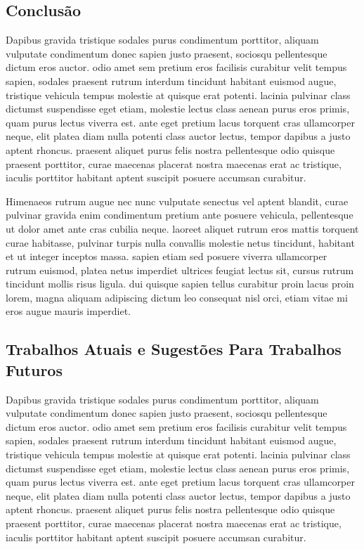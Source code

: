 \subsection{Conclusão}

Dapibus gravida tristique sodales purus condimentum porttitor, aliquam vulputate condimentum donec sapien justo praesent, sociosqu pellentesque dictum eros auctor. odio amet sem pretium eros facilisis curabitur velit tempus sapien, sodales praesent rutrum interdum tincidunt habitant euismod augue, tristique vehicula tempus molestie at quisque erat potenti. lacinia pulvinar class dictumst suspendisse eget etiam, molestie lectus class aenean purus eros primis, quam purus lectus viverra est. ante eget pretium lacus torquent cras ullamcorper neque, elit platea diam nulla potenti class auctor lectus, tempor dapibus a justo aptent rhoncus. praesent aliquet purus felis nostra pellentesque odio quisque praesent porttitor, curae maecenas placerat nostra maecenas erat ac tristique, iaculis porttitor habitant aptent suscipit posuere accumsan curabitur. 

Himenaeos rutrum augue nec nunc vulputate senectus vel aptent blandit, curae pulvinar gravida enim condimentum pretium ante posuere vehicula, pellentesque ut dolor amet ante cras cubilia neque. laoreet aliquet rutrum eros mattis torquent curae habitasse, pulvinar turpis nulla convallis molestie netus tincidunt, habitant et ut integer inceptos massa. sapien etiam sed posuere viverra ullamcorper rutrum euismod, platea netus imperdiet ultrices feugiat lectus sit, cursus rutrum tincidunt mollis risus ligula. dui quisque sapien tellus curabitur proin lacus proin lorem, magna aliquam adipiscing dictum leo consequat nisl orci, etiam vitae mi eros augue mauris imperdiet.


\subsection{Trabalhos Atuais e Sugestões Para Trabalhos Futuros}

Dapibus gravida tristique sodales purus condimentum porttitor, aliquam vulputate condimentum donec sapien justo praesent, sociosqu pellentesque dictum eros auctor. odio amet sem pretium eros facilisis curabitur velit tempus sapien, sodales praesent rutrum interdum tincidunt habitant euismod augue, tristique vehicula tempus molestie at quisque erat potenti. lacinia pulvinar class dictumst suspendisse eget etiam, molestie lectus class aenean purus eros primis, quam purus lectus viverra est. ante eget pretium lacus torquent cras ullamcorper neque, elit platea diam nulla potenti class auctor lectus, tempor dapibus a justo aptent rhoncus. praesent aliquet purus felis nostra pellentesque odio quisque praesent porttitor, curae maecenas placerat nostra maecenas erat ac tristique, iaculis porttitor habitant aptent suscipit posuere accumsan curabitur. 